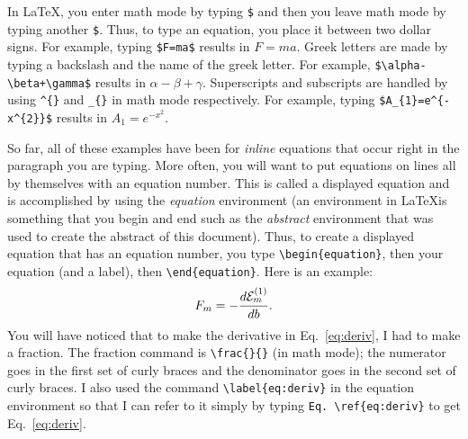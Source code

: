 \documentclass[preprint,pre,floats,aps,amsmath,amssymb]{revtex4}
\begin{document}
In \LaTeX, you enter math mode by typing \verb!$! and then you leave
math mode by typing another \verb!$!.  Thus, to type an equation, you
place it between two dollar signs.  For example, typing \verb!$F=ma$!
results in $F=ma$.  Greek letters are made by typing a backslash and
the name of the greek letter.  For example,
\verb!$\alpha-\beta+\gamma$!  results in $\alpha-\beta+\gamma$.
Superscripts and subscripts are handled by using \verb!^{}! and
\verb!_{}! in math mode respectively.  For example, typing
\verb!$A_{1}=e^{-x^{2}}$! results in $A_{1}=e^{-x^{2}}$.

So far, all of these examples have been for \textit{inline} equations
that occur right in the paragraph you are typing.  More often, you
will want to put equations on lines all by themselves with an equation
number.  This is called a displayed equation and is accomplished by
using the \textit{equation} environment (an environment in \LaTeX is
something that you begin and end such as the \textit{abstract}
environment that was used to create the abstract of this document). 
Thus, to create a displayed equation that has an equation number, you
type \verb!\begin{equation}!, then your equation (and a label), then
\verb!\end{equation}!.  Here is an example:
\begin{equation}
F_m = -\frac{d{\cal E}_m^{(1)} }{db}.
\label{eq:deriv}
\end{equation}
You will have noticed that to make the derivative in
Eq.~\ref{eq:deriv}, I had to make a fraction.  The fraction command is
\verb!\frac{}{}! (in math mode); the numerator goes in the first set
of curly braces and the denominator goes in the second set of curly
braces.  I also used the command \verb!\label{eq:deriv}! in the
equation environment so that I can refer to it simply by typing
\verb!Eq. \ref{eq:deriv}! to get Eq.~\ref{eq:deriv}.
\end{document}
